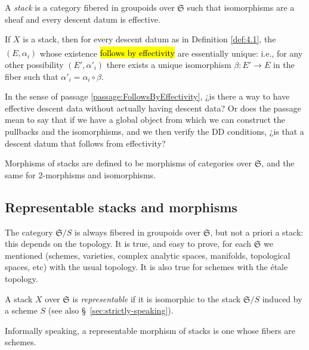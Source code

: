 \documentclass[12pt]{memoir}
\makeatletter
\newcommand{\roundedhighlight}[1]{%
  \begingroup
  \setuloverlap{2pt}%
  \def\SOUL@ulunderline##1{{%
    \setbox\z@\hbox{##1}%
    \rlap{\SOUL@ulcolor{\tikz[overlay,blend mode=darken]{%
      \fill[rounded corners=2pt]
        (-\SOUL@uloverlap,-\SOUL@uldp)
        rectangle (\dimexpr\wd\z@+\SOUL@uloverlap\relax,\SOUL@ulht);%
    }}}%
    \unhcopy\z@
  }}%
  \hl{#1}%
  \endgroup
}
\DeclareRobustCommand{\hlpink}[1]{{\sethlcolor{notepink}\roundedhighlight{#1}}}
\newcounter{passage}
\newcommand{\passagemark}{%
  \refstepcounter{passage}%
  \textsuperscript{\normalfont[\thepassage]}%
}
\makeatother
\begin{document}
\begin{Def}\label{def:4.3}
A \emph{stack} is a category fibered in groupoids over $\mathfrak{S}$ such that isomorphisms are a sheaf and every descent datum is effective.
\end{Def}

If $X$ is a stack, then for every descent datum as in Definition \ref{def:4.1}, the $(E, \alpha_i)$ whose existence \hlpink{follows by effectivity}\passagemark\label{passage:FollowsByEffectivity} are essentially unique: i.e., for any other possibility $(E', \alpha'_i)$ there exists a unique isomorphism $\beta\colon E' \to E$ in the fiber such that $\alpha'_i = \alpha_i \circ \beta$.

\begin{ptcb}
    \begin{Qn}
        In the sense of passage \ref{passage:FollowsByEffectivity}, ¿is there a way to have effective descent data without actually having descent data? Or does the passage mean to say that if we have a global object from which we can construct the pullbacks and the isomorphisms, and we then verify the DD conditions, ¿is that a descent datum that follows from effectivity?
    \end{Qn}
\end{ptcb}

Morphisms of stacks are defined to be morphisms of categories over $\mathfrak{S}$, and the same for 2-morphisms and isomorphisms.

\subsection{Representable stacks and morphisms}

The category $\mathfrak{S}/S$ is always fibered in groupoids over $\mathfrak{S}$, but not a priori a stack: this depends on the topology. It is true, and easy to prove, for each $\mathfrak{S}$ we mentioned (schemes, varieties, complex analytic spaces, manifolds, topological spaces, etc) with the usual topology. It is also true for schemes with the \'etale topology.

\begin{Def}\label{def:4.4}
A stack $X$ over $\mathfrak{S}$ is \emph{representable} if it is isomorphic to the stack $\mathfrak{S}/S$ induced by a scheme $S$ (see also \S~\ref{sec:strictly-speaking}).
\end{Def}

Informally speaking, a representable morphism of stacks is one whose fibers are schemes.
\end{document}
